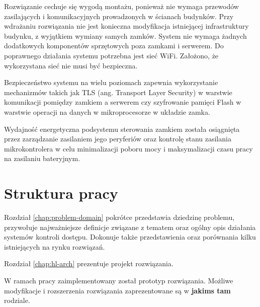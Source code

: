 Rozwiązanie cechuje się wygodą montażu, ponieważ nie wymaga przewodów zasilających i komunikacyjnych prowadzonych w ścianach budynków. Przy wdrażaniu rozwiązania nie jest konieczna modyfikacja istniejącej infrastruktury budynku, z wyjątkiem wymiany samych zamków. System nie wymaga żadnych dodatkowych komponentów sprzętowych poza zamkami i serwerem. Do poprawnego działania systemu potrzebna jest sieć WiFi. Założono, że wykorzystana sieć nie musi być bezpieczna.

Bezpieczeństwo systemu na wielu poziomach zapewnia wykorzystanie mechanizmów takich jak TLS (ang. Transport Layer Security) w warstwie komunikacji pomiędzy zamkiem a serwerem czy szyfrowanie pamięci Flash w warstwie operacji na danych w mikroprocesorze w układzie zamka.

Wydajność energetyczna podsystemu sterowania zamkiem została osiągnięta przez zarządzanie zasilaniem jego peryferiów oraz kontrolę stanu zasilania mikrokontrolera w celu minimalizacji poboru mocy i maksymalizacji czasu pracy na zasilaniu bateryjnym.

\section{Struktura pracy}

Rozdział \ref{chap:problem-domain} pokrótce przedstawia dziedzinę problemu, przywołuje najważniejsze definicje związane z tematem oraz ogólny opis działania systemów kontroli dostępu. Dokonuje także przedstawienia oraz porównania kilku istniejących na rynku rozwiązań.

Rozdział \ref{chap:hl-arch} prezentuje projekt rozwiązania.

W ramach pracy zaimplementowany został prototyp rozwiązania. Możliwe modyfikacje i rozszerzenia rozwiązania zaprezentowane są w \textbf{jakims tam} rodziale.

